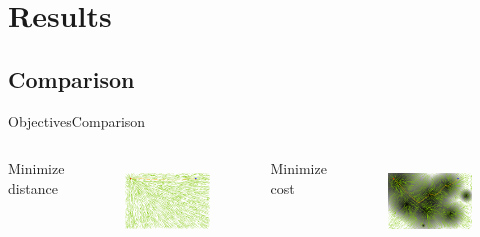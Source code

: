 \section{Results}

\subsection{Comparison}

\begin{frame}{Objectives}{Comparison}
\begin{columns}
	{\Large Minimize distance}
	\begin{figure}
		\centering
		\includegraphics[width=\linewidth]{figure/sim2-2obj/MORRTstar00-0.png}
		\label{fig:sim:01:prob1}
	\end{figure}
	{\Large Minimize cost}
	\begin{figure}
		\centering
		\includegraphics[width=\linewidth]{figure/sim2-2obj/MORRTstar00-1.png}
		\label{fig:sim:01:prob2}
	\end{figure}
\end{columns}
\end{frame}

